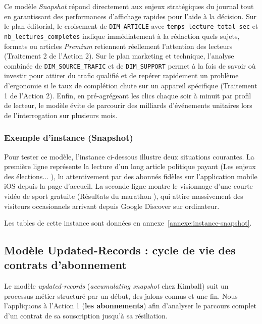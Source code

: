 \documentclass[a4paper,12pt]{article}
\begin{document}
Ce modèle \emph{Snapshot} répond directement aux enjeux stratégiques du journal tout en garantissant des performances d'affichage rapides pour l'aide à la décision. Sur le plan éditorial, le croisement de \texttt{DIM\_ARTICLE} avec \texttt{temps\_lecture\_total\_sec} et \texttt{nb\_lectures\_completes} indique immédiatement à la rédaction quels sujets, formats ou articles \emph{Premium} retiennent réellement l'attention des lecteurs (Traitement 2 de l'Action 2). Sur le plan marketing et technique, l'analyse combinée de \texttt{DIM\_SOURCE\_TRAFIC} et de \texttt{DIM\_SUPPORT} permet à la fois de savoir où investir pour attirer du trafic qualifié et de repérer rapidement un problème d'ergonomie si le taux de complétion chute sur un appareil spécifique (Traitement 1 de l'Action 2). Enfin, en pré-agrégeant les clics chaque soir à minuit par profil de lecteur, le modèle évite de parcourir des milliards d'événements unitaires lors de l'interrogation sur plusieurs mois.

\subsubsection*{Exemple d'instance (Snapshot)}

Pour tester ce modèle, l'instance ci-dessous illustre deux situations courantes. La première ligne représente la lecture d'un long article politique payant (\og Les enjeux des élections... \fg{}), lu attentivement par des abonnés fidèles sur l'application mobile iOS depuis la page d'accueil. La seconde ligne montre le visionnage d'une courte vidéo de sport gratuite (\og Résultats du marathon \fg{}), qui attire massivement des visiteurs occasionnels arrivant depuis Google Discover sur ordinateur.

Les tables de cette instance sont données en
annexe~\ref{annexe:instance-snapshot}.


\newpage
\subsection{Modèle Updated-Records : cycle de vie des contrats d'abonnement}

Le modèle \emph{updated-records} (\emph{accumulating snapshot} chez Kimball) suit un processus métier structuré par un début, des jalons connus et une fin. Nous l'appliquons à l'Action 1 (\textbf{les abonnements}) afin d'analyser le parcours complet d'un contrat de sa souscription jusqu'à sa résiliation.
\end{document}

